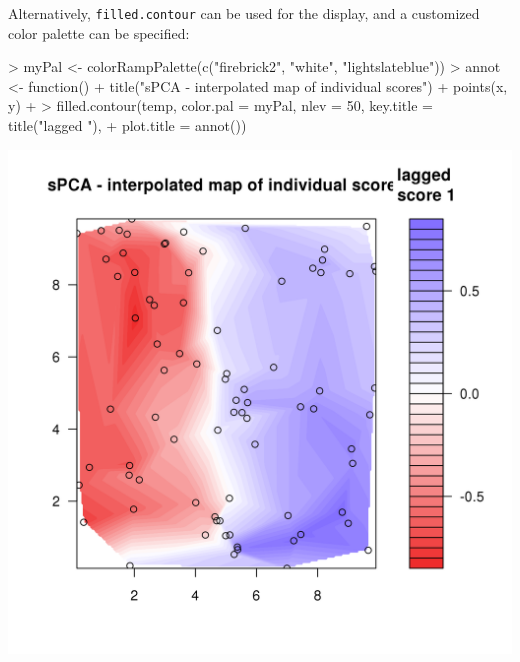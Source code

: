 \documentclass{article}
\begin{document}
\noindent Alternatively, \texttt{filled.contour} can be used for the display, and a customized color
palette can be specified:
\begin{Schunk}
\begin{Sinput}
> myPal <- colorRampPalette(c("firebrick2", "white", "lightslateblue"))
> annot <- function() {
+     title("sPCA - interpolated map of individual scores")
+     points(x, y)
+ }
> filled.contour(temp, color.pal = myPal, nlev = 50, key.title = title("lagged "), 
+     plot.title = annot())
\end{Sinput}
\end{Schunk}
\includegraphics{figs/spca-023}
~\\
\end{document}
